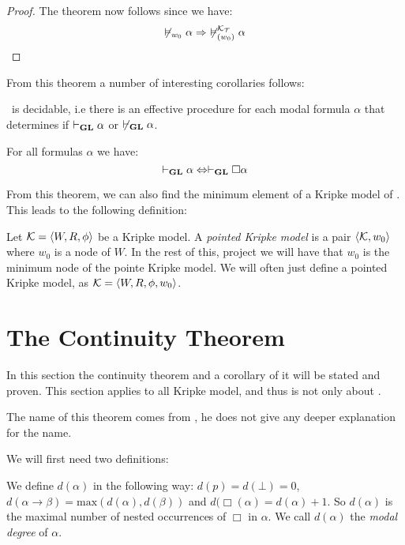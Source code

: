 \documentclass[../main.tex]{subfiles}
\begin{document}
\begin{proof}
	The theorem now follows since we have:
	\[\not\vDash_{w_0}\alpha\Rightarrow\
	\not\vDash_{(w_0)}^{\mathcal{K}_{\mathcal{T}}}\alpha\]
\end{proof}

From this theorem a number of interesting corollaries follows: 

\begin{cor}
	\GL\ is decidable, i.e there is an effective procedure for each modal formula
	$\alpha$ that determines if $\vdash_{\text{\textbf{GL}}}\alpha$ or
	$\not\vdash_{\text{\textbf{GL}}}\alpha$.
\end{cor}
\begin{cor}
	\label{cor:Nec}
	For all formulas $\alpha$ we have:
	\[\vdash_{\text{\textbf{GL}}}\alpha\Leftrightarrow\vdash_{\text{\textbf{GL}}}\Box\alpha\]
\end{cor}

From this theorem, we can also find the minimum element of a Kripke model of
\GL. This leads to the following definition:

\begin{defi}
	Let $\mathcal{K}=\langle W,R,\phi\rangle$ be a Kripke model. A \textit{pointed
	Kripke model} is a pair $\langle \mathcal{K},w_0\rangle$ where $w_0$ is a node
	of $W$. In the rest of this, project we will have that $w_0$ is the
	minimum node of the pointe Kripke model. We will often just define a pointed
	Kripke model, as $\mathcal{K}=\langle W,R,\phi,w_0\rangle$.
\end{defi}

\section{The Continuity Theorem}
In this section the continuity theorem and a corollary of it will be stated and
proven. This section applies to all Kripke model, and thus is not only about
\GL.

The name of this theorem comes from \citet{Boolos1993}, he does not give
any deeper explanation for the name.

We will first need two definitions:
\begin{defi}
	We define $d(\alpha)$ in the following way: $d(p)=d(\bot)=0$,
	$d(\alpha\rightarrow\beta)=\text{max}(d(\alpha),d(\beta))$ and
	$d(\Box(\alpha)=d(\alpha)+1$. So $d(\alpha)$ is the maximal number of
	nested occurrences of $\Box$ in $\alpha$. We call $d(\alpha)$ the
	\textit{modal
	degree} of $\alpha$.
\end{defi}
\end{document}
